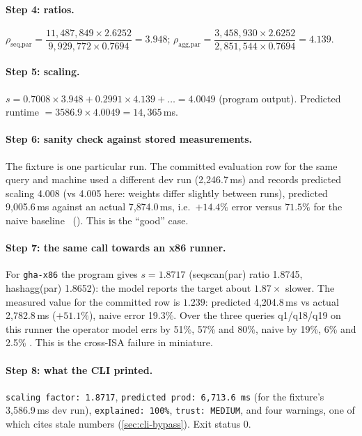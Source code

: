 \paragraph{Step 4: ratios.}
$\rho_{\text{seq,par}}=\dfrac{11{,}487{,}849\times2.6252}{9{,}929{,}772\times0.7694}=3.948$;\quad
$\rho_{\text{agg,par}}=\dfrac{3{,}458{,}930\times2.6252}{2{,}851{,}544\times0.7694}=4.139$.

\paragraph{Step 5: scaling.} $s=0.7008\times3.948+0.2991\times4.139+\ldots=4.0049$ (program output). Predicted runtime $=3586.9\times4.0049=14{,}365$\,ms.

\paragraph{Step 6: sanity check against stored measurements.} The fixture is one particular run. The committed evaluation row for the same query and
machine used a different dev run (2{,}246.7\,ms) and records predicted scaling 4.008 (vs 4.005 here: weights differ slightly between runs),
predicted 9{,}005.6\,ms against an actual 7{,}874.0\,ms, i.e.\ $+14.4\%$ error versus $71.5\%$ for the naive baseline \evFILE\ ().
This is the ``good'' case.

\paragraph{Step 7: the same call towards an x86 runner.} For \texttt{gha-x86} the program gives $s=1.8717$ (seqscan(par) ratio 1.8745, hashagg(par) 1.8652):
the model reports the target about $1.87\times$ slower. The measured value for the committed row is $1.239$: predicted 4{,}204.8\,ms vs actual 2{,}782.8\,ms ($+51.1\%$), naive error
19.3\%. Over the three queries q1/q18/q19 on this runner the operator model errs by 51\%, 57\% and 80\%, naive by 19\%, 6\% and 2.5\% \evFILE. This is the cross-ISA failure in miniature.

\paragraph{Step 8: what the CLI printed.} \texttt{scaling factor: 1.8717}, \texttt{predicted prod: 6,713.6 ms} (for the fixture's 3{,}586.9\,ms dev run),
\texttt{explained: 100\%}, \texttt{trust: MEDIUM}, and four warnings, one of which cites stale numbers (\cref{sec:cli-bypass}). Exit status 0.

